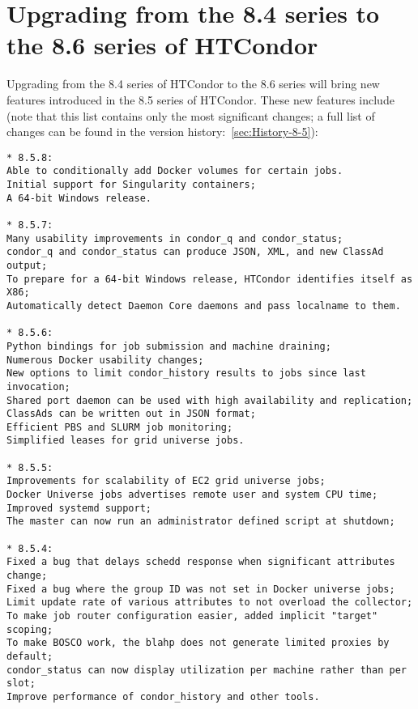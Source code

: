 \section{\label{sec:to-8.6}Upgrading from the 8.4 series to the 8.6 series of HTCondor}

Upgrading from the 8.4 series of HTCondor to the 8.6 series
will bring new features introduced in the 8.5 series of HTCondor.
These new features include (note that this list contains only
the most significant changes; a full list of changes can be
found in the version history:~\ref{sec:History-8-5}):

\begin{verbatim}
* 8.5.8:
Able to conditionally add Docker volumes for certain jobs.
Initial support for Singularity containers;
A 64-bit Windows release.

* 8.5.7:
Many usability improvements in condor_q and condor_status;
condor_q and condor_status can produce JSON, XML, and new ClassAd output;
To prepare for a 64-bit Windows release, HTCondor identifies itself as X86;
Automatically detect Daemon Core daemons and pass localname to them.

* 8.5.6:
Python bindings for job submission and machine draining;
Numerous Docker usability changes;
New options to limit condor_history results to jobs since last invocation;
Shared port daemon can be used with high availability and replication;
ClassAds can be written out in JSON format;
Efficient PBS and SLURM job monitoring;
Simplified leases for grid universe jobs.

* 8.5.5:
Improvements for scalability of EC2 grid universe jobs;
Docker Universe jobs advertises remote user and system CPU time;
Improved systemd support;
The master can now run an administrator defined script at shutdown;

* 8.5.4:
Fixed a bug that delays schedd response when significant attributes change;
Fixed a bug where the group ID was not set in Docker universe jobs;
Limit update rate of various attributes to not overload the collector;
To make job router configuration easier, added implicit "target" scoping;
To make BOSCO work, the blahp does not generate limited proxies by default;
condor_status can now display utilization per machine rather than per slot;
Improve performance of condor_history and other tools.


\end{verbatim}
